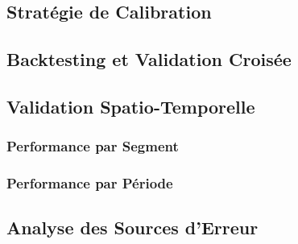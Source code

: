 \subsection{Stratégie de Calibration}
\label{subsec:strategie_calibration}

\subsection{Backtesting et Validation Croisée}
\label{subsec:backtesting}

\subsection{Validation Spatio-Temporelle}
\label{subsec:validation_spatiotemporelle}

\subsubsection{Performance par Segment}

\subsubsection{Performance par Période}

\subsection{Analyse des Sources d'Erreur}
\label{subsec:analyse_erreurs}



